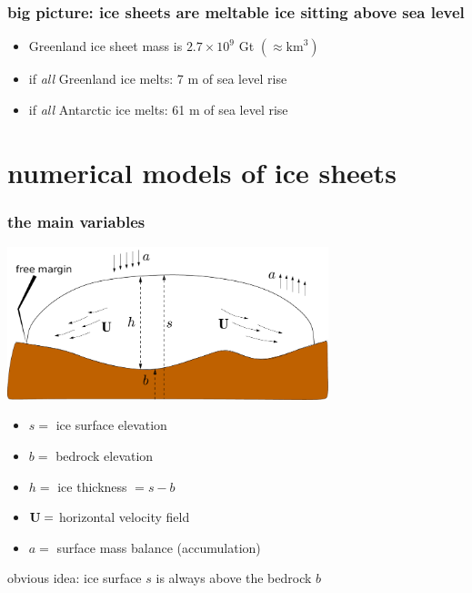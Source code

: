 \documentclass{beamer}
\begin{document}
\begin{frame}
  \frametitle{big picture: ice sheets are meltable ice sitting above sea level}

\small
\begin{itemize}
\item Greenland ice sheet mass is $2.7 \times 10^9$ Gt \quad $(\approx \text{km}^3)$ %
\item if \emph{all} Greenland ice melts: 7 m of sea level rise
\item if \emph{all} Antarctic ice melts: 61 m of sea level rise
\end{itemize}
\end{frame}



\section[numerical models]{numerical models of ice sheets}


\begin{frame}
  \frametitle{the main variables}

\begin{center}
\includegraphics[width=0.7\textwidth]{groundedscheme}
\end{center}

\begin{itemize}
\small
\item $s=$ ice surface elevation
\item $b=$ bedrock elevation
\item $h=$ ice thickness $ = s-b$
\item ${\bf U}=$ horizontal velocity field
\item $a=$ surface mass balance (accumulation)
\end{itemize}

\begin{alertblock}{obvious idea: ice surface $s$ is always above the bedrock $b$}
\end{alertblock}
\end{frame}
\end{document}
